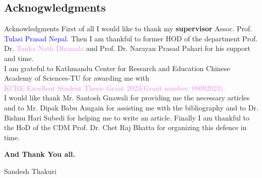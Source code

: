 \documentclass{beamer}
\begin{document}
\subsection{Acknogwledgments}
\begin{frame}{Acknowledgments}
\footnotesize
First of all I would like to thank my \textbf{supervisor} Assoc. Prof. \textcolor{blue}{Tulasi Prasad Nepal}. Then I am thankful to former HOD of the department Prof. Dr. \textcolor{violet}{Tanka Nath Dhamala} and Prof. Dr. \textcolor{green!50!black}{Narayan Prasad Pahari} for his support and time.\\[4mm]


I am grateful to  Kathmandu Center for Research and Education Chinese Academy of Sciences-TU for awarding me with \\
\textcolor{violet}{KCRE Excellent Student Thesis Grant 2023(Grant number: 08092023).}\\[4mm]

I would like thank  Mr. \textcolor{green!50!black}{Santosh Gnawali} for providing me the necessary articles and to Mr. \textcolor{green!50!black}{Dipak Babu Amgain} for assisting me with the bibliography and to Dr. \textcolor{green!50!black}{Bishnu Hari Subedi} for helping me to write an article. Finally I am thankful to the HoD of the CDM  Prof. Dr. \textcolor{green!50!black}{Chet Raj Bhatta} for organizing this defence in time.
\\[4mm]
\begin{center}
  \large \bfseries \color{magenta}
  And Thank You all.
  \end{center}
\begin{minipage}{1\textwidth}
	\begin{flushright}
		{\color {blue} Sandesh Thakuri}\\
	\end{flushright}
      \end{minipage}
    \end{frame}
\end{document}
